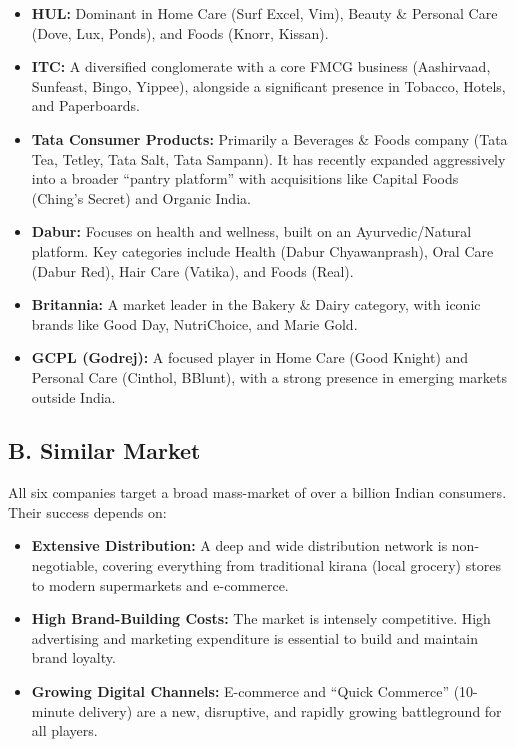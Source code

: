 \documentclass[12pt, a4paper]{report}
\begin{document}
\begin{itemize}
    \item \textbf{HUL:} Dominant in Home Care (Surf Excel, Vim), Beauty \& Personal Care (Dove, Lux, Ponds), and Foods (Knorr, Kissan).
    
    \item \textbf{ITC:} A diversified conglomerate with a core FMCG business (Aashirvaad, Sunfeast, Bingo, Yippee), alongside a significant presence in Tobacco, Hotels, and Paperboards.
    
    \item \textbf{Tata Consumer Products:} Primarily a Beverages \& Foods company (Tata Tea, Tetley, Tata Salt, Tata Sampann). It has recently expanded aggressively into a broader ``pantry platform'' with acquisitions like Capital Foods (Ching's Secret) and Organic India.
    
    \item \textbf{Dabur:} Focuses on health and wellness, built on an Ayurvedic/Natural platform. Key categories include Health (Dabur Chyawanprash), Oral Care (Dabur Red), Hair Care (Vatika), and Foods (Real).
    
    \item \textbf{Britannia:} A market leader in the Bakery \& Dairy category, with iconic brands like Good Day, NutriChoice, and Marie Gold.
    
    \item \textbf{GCPL (Godrej):} A focused player in Home Care (Good Knight) and Personal Care (Cinthol, BBlunt), with a strong presence in emerging markets outside India.
\end{itemize}

\subsection{B. Similar Market}

All six companies target a broad mass-market of over a billion Indian consumers. Their success depends on:

\begin{itemize}
    \item \textbf{Extensive Distribution:} A deep and wide distribution network is non-negotiable, covering everything from traditional kirana (local grocery) stores to modern supermarkets and e-commerce.
    
    \item \textbf{High Brand-Building Costs:} The market is intensely competitive. High advertising and marketing expenditure is essential to build and maintain brand loyalty.
    
    \item \textbf{Growing Digital Channels:} E-commerce and ``Quick Commerce'' (10-minute delivery) are a new, disruptive, and rapidly growing battleground for all players.
\end{itemize}
\end{document}
